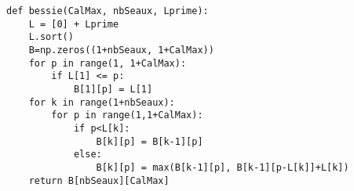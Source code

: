\begin{Answer}
\begin{lstlisting}
def bessie(CalMax, nbSeaux, Lprime):
    L = [0] + Lprime 
    L.sort() 
    B=np.zeros((1+nbSeaux, 1+CalMax))
    for p in range(1, 1+CalMax):
        if L[1] <= p:
            B[1][p] = L[1]
    for k in range(1+nbSeaux):
        for p in range(1,1+CalMax):
            if p<L[k]:
                B[k][p] = B[k-1][p]
            else:
                B[k][p] = max(B[k-1][p], B[k-1][p-L[k]]+L[k])
    return B[nbSeaux][CalMax]
\end{lstlisting}
\end{Answer}
